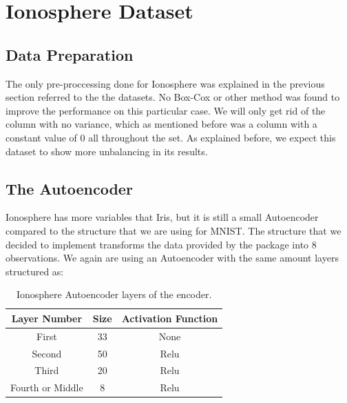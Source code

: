 \documentclass[12pt]{report}
\begin{document}
\section{Ionosphere Dataset}
\subsection{Data Preparation}

The only pre-proccessing done for Ionosphere was explained in the previous section referred to the the datasets. No Box-Cox or other method was found to improve the performance on this particular case. We will only get rid of the column with no variance, which as mentioned before was a column with a constant value of 0 all throughout the set. As explained before, we expect this dataset to show more unbalancing in its results.

\subsection{The Autoencoder}

Ionosphere has more variables that Iris, but it is still a small Autoencoder compared to the structure that we are using for MNIST. The structure that we decided to implement transforms the data provided by the package into 8 observations. We again are using an Autoencoder with the same amount layers structured as:  \newline

\begin{table}[H]
		\caption{Ionosphere Autoencoder layers of the encoder.}
	\begin{center}
	\label{tab:table_Ionosphere_auto_encoder}
		\begin{tabular}{c|c|c} %
			\textbf{Layer Number} & \textbf{Size} & \textbf{Activation Function} \\
			\hline
			First & 33 & None\\
			Second & 50 & Relu\\
			Third & 20 & Relu\\
			Fourth or Middle & 8 & Relu\\
		\end{tabular}
	\end{center}
\end{table}
\end{document}
